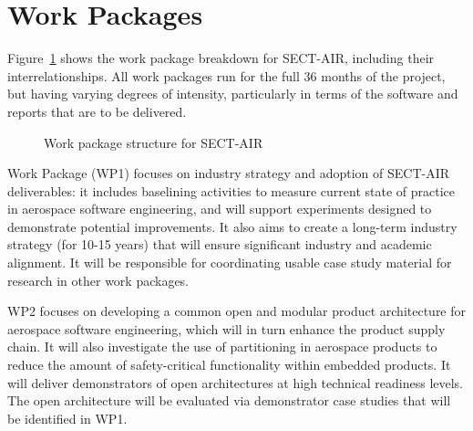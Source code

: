 \section{Work Packages}
\label{sec:work-packages}

Figure~\ref{fig:wps} shows the work package breakdown for SECT-AIR, including their interrelationships. All work packages run for the full 36 months of the project, but having
varying degrees of intensity, particularly in terms of the software and reports that are 
to be delivered.

\begin{figure}[htbp]
\centerline{}
\caption{Work package structure for SECT-AIR}
\label{fig:wps}
\end{figure}

Work Package (WP1) focuses
on industry strategy and adoption of SECT-AIR deliverables: it includes baselining activities to measure current state of practice in aerospace software engineering, and will
support experiments designed to demonstrate potential improvements. It also aims to create a long-term industry strategy (for 10-15 years)
that will ensure significant industry and academic alignment. It will be responsible for coordinating usable case study material for research in other work
packages.

WP2 focuses on developing a common open and modular product architecture for aerospace software engineering, which will in turn enhance the product
supply chain. It will also investigate the use of partitioning in aerospace products to reduce the amount of safety-critical functionality within embedded products.
It will deliver demonstrators of open architectures at high technical readiness levels. The open architecture will be evaluated via demonstrator case studies that
will be identified in WP1.

